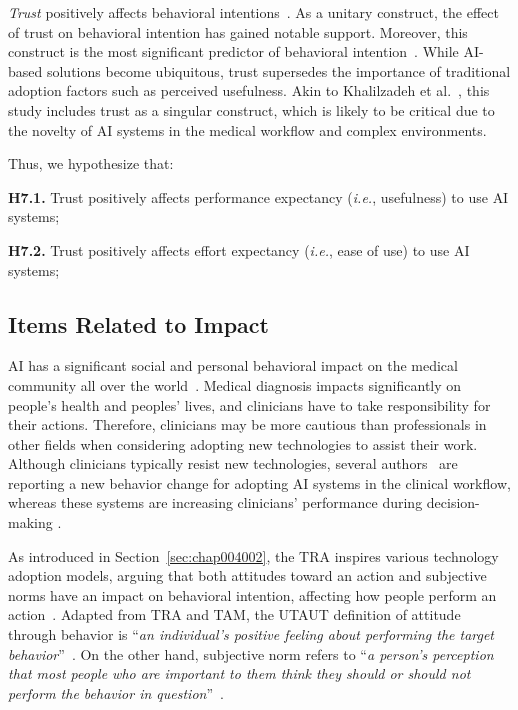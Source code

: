 \vspace{2.00mm}

{\it Trust} positively affects behavioral intentions~\cite{HART201993}.
As a unitary construct, the effect of trust on behavioral intention has gained notable support.
Moreover, this construct is the most significant predictor of behavioral intention~\cite{CALISTO2022102922, HART201993}.
While \ac{AI}-based solutions become ubiquitous, trust supersedes the importance of traditional adoption factors such as perceived usefulness.
Akin to Khalilzadeh et al.~\cite{KHALILZADEH2017460}, this study includes trust as a singular construct, which is likely to be critical due to the novelty of \ac{AI} systems in the medical workflow and complex environments.

\vspace{2.00mm}

\noindent
Thus, we hypothesize that:

\vspace{2.00mm}

\noindent
{\bf H7.1.} Trust positively affects performance expectancy ({\it i.e.}, usefulness) to use \ac{AI} systems;

\vspace{2.00mm}

\noindent
{\bf H7.2.} Trust positively affects effort expectancy ({\it i.e.}, ease of use) to use \ac{AI} systems;

\subsection{Items Related to Impact}
\label{sec:chap004003003}

\ac{AI} has a significant social and personal behavioral impact on the medical community all over the world~\cite{CALISTO2022102922}.
Medical diagnosis impacts significantly on people's health and peoples' lives, and clinicians have to take responsibility for their actions.
Therefore, clinicians may be more cautious than professionals in other fields when considering adopting new technologies to assist their work.
Although clinicians typically resist new technologies, several authors~\cite{doi:10.1148/ryai.2020190043, WAYMEL2019327} are reporting a new behavior change for adopting \ac{AI} systems in the clinical workflow, whereas these systems are increasing clinicians' performance during decision-making \cite{CALISTO2021102607}.

As introduced in Section~\ref{sec:chap004002}, the \ac{TRA} inspires various technology adoption models, arguing that both attitudes toward an action and subjective norms have an impact on behavioral intention, affecting how people perform an action~\cite{CALISTO2022102922}.
Adapted from \ac{TRA} and \ac{TAM}, the \ac{UTAUT} definition of attitude through behavior is ``{\it an individual's positive feeling about performing the target behavior}''~\cite{KHALILZADEH2017460}.
On the other hand, subjective norm refers to ``{\it a person's perception that most people who are important to them think they should or should not perform the behavior in question}''~\cite{WAYMEL2019327}.

